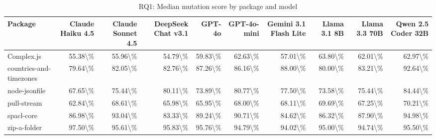 \begin{table}[htbp]
\centering
{\small
\begin{tabular}{l|rrrrrrrrr}
\toprule
\textbf{Package} & \textbf{Claude Haiku 4.5} & \textbf{Claude Sonnet 4.5} & \textbf{DeepSeek Chat v3.1} & \textbf{GPT-4o} & \textbf{GPT-4o-mini} & \textbf{Gemini 3.1 Flash Lite} & \textbf{Llama 3.1 8B} & \textbf{Llama 3.3 70B} & \textbf{Qwen 2.5 Coder 32B} \\
\midrule
Complex.js & 55.38\textbackslash{}\% & 55.96\textbackslash{}\% & 54.79\textbackslash{}\% & 59.83\textbackslash{}\% & 62.63\textbackslash{}\% & 57.01\textbackslash{}\% & 63.80\textbackslash{}\% & 62.01\textbackslash{}\% & 62.97\textbackslash{}\% \\
countries-and-timezones & 79.64\textbackslash{}\% & 82.05\textbackslash{}\% & 82.76\textbackslash{}\% & 87.26\textbackslash{}\% & 86.16\textbackslash{}\% & 88.00\textbackslash{}\% & 80.00\textbackslash{}\% & 83.21\textbackslash{}\% & 92.64\textbackslash{}\% \\
node-jsonfile & 67.65\textbackslash{}\% & 75.44\textbackslash{}\% & 80.11\textbackslash{}\% & 73.89\textbackslash{}\% & 80.77\textbackslash{}\% & 77.50\textbackslash{}\% & 73.58\textbackslash{}\% & 75.44\textbackslash{}\% & 84.44\textbackslash{}\% \\
pull-stream & 62.84\textbackslash{}\% & 68.61\textbackslash{}\% & 65.98\textbackslash{}\% & 65.95\textbackslash{}\% & 68.00\textbackslash{}\% & 68.11\textbackslash{}\% & 69.69\textbackslash{}\% & 67.25\textbackslash{}\% & 70.21\textbackslash{}\% \\
spacl-core & 86.98\textbackslash{}\% & 93.04\textbackslash{}\% & 83.33\textbackslash{}\% & 89.24\textbackslash{}\% & 90.71\textbackslash{}\% & 84.62\textbackslash{}\% & 86.32\textbackslash{}\% & 87.90\textbackslash{}\% & 94.98\textbackslash{}\% \\
zip-a-folder & 97.50\textbackslash{}\% & 95.61\textbackslash{}\% & 95.83\textbackslash{}\% & 95.76\textbackslash{}\% & 94.79\textbackslash{}\% & 94.02\textbackslash{}\% & 95.00\textbackslash{}\% & 94.74\textbackslash{}\% & 95.50\textbackslash{}\% \\
\bottomrule
\end{tabular}
}
\caption{RQ1: Median mutation score by package and model}
\label{tab:rq1-package-breakdown}
\end{table}